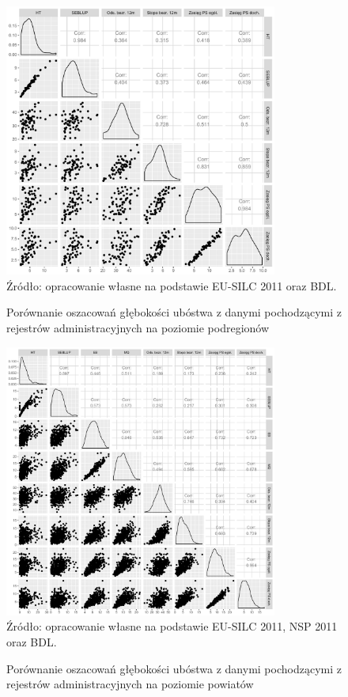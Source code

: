 \begin{figure}[ht]
\caption{Porównanie oszacowań głębokości ubóstwa z danymi pochodzącymi z rejestrów administracyjnych na poziomie podregionów}
\centering
\includegraphics[width=0.8\textwidth]{05_wykresy/pgi_podreg_por-1.pdf}\\
\small{Źródło: opracowanie własne na podstawie EU-SILC 2011 oraz BDL.}
\label{fig:pgi_podreg_por}
\end{figure}

\begin{figure}[ht]
\caption{Porównanie oszacowań głębokości ubóstwa z danymi pochodzącymi z rejestrów administracyjnych na poziomie powiatów}
\centering
\includegraphics[width=0.8\textwidth]{05_wykresy/pgi_pow_por-1.pdf}\\
\small{Źródło: opracowanie własne na podstawie EU-SILC 2011, NSP 2011 oraz BDL.}
\label{fig:pgi_pow_por}
\end{figure}


